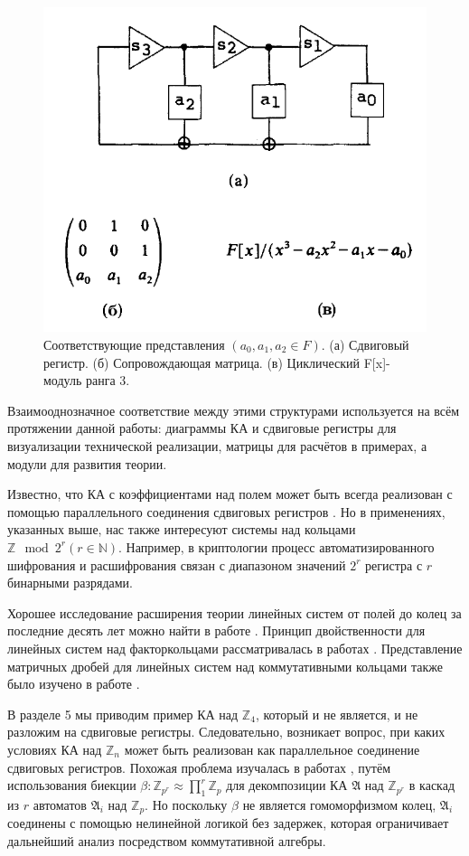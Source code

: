 \documentclass[a4paper,12pt]{article}
\begin{document}
\begin{figure}[h]
	\centering
	\includegraphics[width=0.5\linewidth]{pictures/fig1abc.png}
	\caption{Соответствующие представления $(a_0, a_1 , a_2 \in F)$. (а) Сдвиговый регистр. (б) Сопровождающая матрица. (в) Циклический F[x]-модуль ранга 3.}
	\label{fig1abc}
\end{figure}

Взаимооднозначное соответствие между этими структурами используется на всём протяжении данной работы: диаграммы КА и сдвиговые регистры для визуализации технической реализации, матрицы для расчётов в примерах, а модули для развития теории.

Известно, что КА с коэффициентами над полем может быть всегда реализован с помощью параллельного соединения сдвиговых регистров \cite{bib9}. Но в применениях, указанных выше, нас также интересуют системы над кольцами $\mathbb{Z} \mod 2^r (r \in \mathbb{N})$. Например, в криптологии процесс автоматизированного шифрования и расшифрования связан с диапазоном значений $2^r$ регистра с $r$ бинарными разрядами.

Хорошее исследование расширения теории линейных систем от полей до колец за последние десять лет можно найти в работе \cite{bib12}. Принцип двойственности для линейных систем над факторкольцами рассматривалась в работах \cite{bib2,bib8}. Представление матричных дробей для линейных систем над коммутативными кольцами также было изучено в работе \cite{bib5}.

В разделе 5 мы приводим пример КА над $\mathbb{Z}_4$, который и не является, и не разложим на сдвиговые регистры. Следовательно, возникает вопрос, при каких условиях КА над $\mathbb{Z}_n$ может быть реализован как параллельное соединение сдвиговых регистров. Похожая проблема изучалась в работах \cite{bib6, bib7}, путём использования биекции $\beta : \mathbb{Z}_{p^r} \approx \prod_{1}^{r}\mathbb{Z}_p$ для декомпозиции КА $\mathfrak{A}$ над $\mathbb{Z}_{p^r}$ в каскад из $r$ автоматов $\mathfrak{A}_i$ над $\mathbb{Z}_p$. Но поскольку $\beta$ не является гомоморфизмом колец, $\mathfrak{A}_i$ соединены с помощью нелинейной логикой без задержек, которая ограничивает дальнейший анализ посредством коммутативной алгебры.
\end{document}
